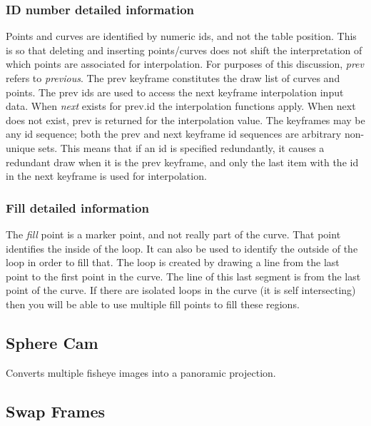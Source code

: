 \subsubsection*{ID number detailed information}%
\label{ssub:id_number_detailed_information}

Points and curves are identified by numeric ids, and not the table position. This is so that deleting and inserting points/curves does not shift the interpretation of which points are associated for interpolation. For purposes of this discussion, \textit{prev} refers to \textit{previous}. The prev keyframe constitutes the draw list of curves and points. The prev ids are used to access the next keyframe interpolation input data. When \textit{next} exists for prev.id the interpolation functions apply. When next does not exist, prev is returned for the interpolation value. The keyframes may be any id sequence; both the prev and next keyframe id sequences are arbitrary non-unique sets. This means that if an id is specified redundantly, it causes a redundant draw when it is the prev keyframe, and only the last item with the id in the next keyframe is used for interpolation.

\subsubsection*{Fill detailed information}%
\label{ssub:fill_detailed_information}

The \textit{fill} point is a marker point, and not really part of the curve. That point identifies the inside of the loop. It can also be used to identify the outside of the loop in order to fill that. The loop is created by drawing a line from the last point to the first point in the curve. The line of this last segment is from the last point of the curve. If there are isolated loops in the curve (it is self intersecting) then you will be able to use multiple fill points to fill these regions.

\subsection{Sphere Cam}%
\label{sub:sphere_cam}

Converts multiple fisheye images into a panoramic projection.

\subsection{Swap Frames}%
\label{sub:swap_frames}


